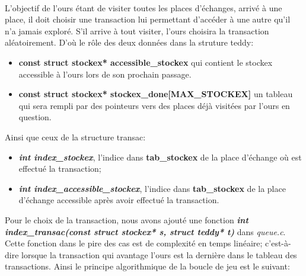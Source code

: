 \documentclass[a4paper,12pt]{article}
\begin{document}
\paragraph{}
L'objectif de l'ours étant de visiter toutes les places d'échanges, arrivé à une place, il doit choisir une transaction lui permettant d'accéder à une autre qu'il n'a jamais exploré. S'il arrive à tout visiter, l'ours choisira la transaction aléatoirement. D'où le rôle des deux données dans la struture teddy:
\newline
\begin{itemize}
\item \textbf{const struct stockex* accessible\_stockex} qui contient le stockex accessible à l'ours lors de son prochain passage. 
\item \textbf{const struct stockex* stockex\_done[MAX\_STOCKEX]} un tableau qui sera rempli par des pointeurs vers des places déjà visitées par l'ours en question. \\
\end{itemize} 

Ainsi que ceux de la structure transac:
\begin{itemize}
\item \emph{\textbf{int index\_stockex}}, l'indice dans \textbf{tab\_stockex} de la place d'échange où est effectué la transaction;
\item \emph{\textbf{int index\_accessible\_stockex}}, l'indice dans \textbf{tab\_stockex} de la place d'échange accessible après avoir effectué la transaction.\\
\end{itemize}
Pour le choix de la transaction, nous avons ajouté une fonction \emph{\textbf{int index\_transac(const struct stockex* s, struct teddy* t)}} dans \emph{queue.c}. Cette fonction dans le pire des cas est de complexité en temps linéaire; c'est-à-dire lorsque la transaction qui avantage l'ours est la dernière dans le tableau des transactions.
\newline
\newline
Ainsi le principe algorithmique de la boucle de jeu est le suivant:\\
\end{document}
